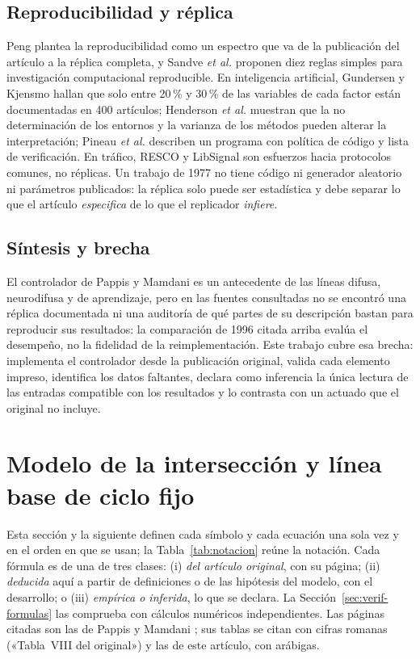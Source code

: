 \documentclass[journal]{IEEEtran}
\begin{document}
\subsection{Reproducibilidad y réplica}
\label{sec:sota-repro}
Peng \cite{Peng2011} plantea la reproducibilidad como un espectro que va de la publicación del artículo a la réplica completa, y Sandve \emph{et al.} \cite{Sandve2013} proponen diez reglas simples para investigación computacional reproducible. En inteligencia artificial, Gundersen y Kjensmo \cite{Gundersen2018} hallan que solo entre 20\,\% y 30\,\% de las variables de cada factor están documentadas en 400 artículos; Henderson \emph{et al.} \cite{Henderson2018} muestran que la no determinación de los entornos y la varianza de los métodos pueden alterar la interpretación; Pineau \emph{et al.} \cite{Pineau2021} describen un programa con política de código y lista de verificación. En tráfico, RESCO y LibSignal \cite{Ault2021,Mei2024} son esfuerzos hacia protocolos comunes, no réplicas. Un trabajo de 1977 no tiene código ni generador aleatorio ni parámetros publicados: la réplica solo puede ser estadística y debe separar lo que el artículo \emph{especifica} de lo que el replicador \emph{infiere}.

\subsection{Síntesis y brecha}
\label{sec:sota-brecha}
El controlador de Pappis y Mamdani es un antecedente de las líneas difusa, neurodifusa y de aprendizaje, pero en las fuentes consultadas no se encontró una réplica documentada ni una auditoría de qué partes de su descripción bastan para reproducir sus resultados: la comparación de 1996 citada arriba evalúa el desempeño, no la fidelidad de la reimplementación. Este trabajo cubre esa brecha: implementa el controlador desde la publicación original, valida cada elemento impreso, identifica los datos faltantes, declara como inferencia la única lectura de las entradas compatible con los resultados y lo contrasta con un actuado que el original no incluye.

\section{Modelo de la intersección y línea base de ciclo fijo}
\label{sec:modelo}

Esta sección y la siguiente definen cada símbolo y cada ecuación una sola vez y en el orden en que se usan; la Tabla~\ref{tab:notacion} reúne la notación. Cada fórmula es de una de tres clases: (i) \emph{del artículo original}, con su página; (ii) \emph{deducida} aquí a partir de definiciones o de las hipótesis del modelo, con el desarrollo; o (iii) \emph{empírica o inferida}, lo que se declara. La Sección~\ref{sec:verif-formulas} las comprueba con cálculos numéricos independientes. Las páginas citadas son las de Pappis y Mamdani \cite{Pappis1977}; sus tablas se citan con cifras romanas («Tabla~VIII del original») y las de este artículo, con arábigas.
\end{document}
